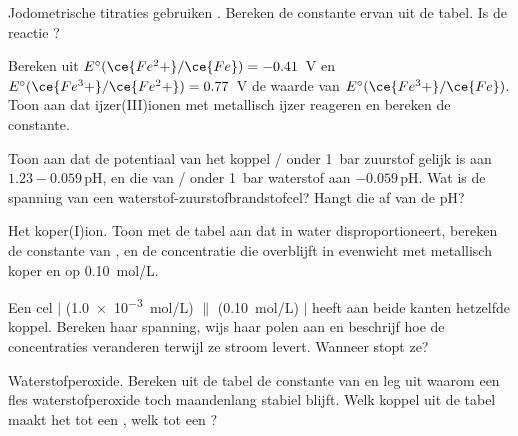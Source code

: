 \begin{exercise}[$\star\star$]\label{exo:b1:nernst:7}
Jodometrische titraties gebruiken .
Bereken de constante ervan uit de tabel. Is de reactie ?
\end{exercise}

\begin{exercise}[$\star\star$]\label{exo:b1:nernst:8}
Bereken uit $E^\circ(\ce{Fe^2+}/\ce{Fe}) = -0.41$~V en $E^\circ(\ce{Fe^3+}/\ce{Fe^2+})
= 0.77$~V de waarde van $E^\circ(\ce{Fe^3+}/\ce{Fe})$. Toon aan dat
ijzer(III)ionen met metallisch ijzer reageren en bereken de constante.
\end{exercise}

\begin{exercise}[$\star\star$]\label{exo:b1:nernst:9}
Toon aan dat de potentiaal van het koppel / onder
\qty{1}{bar} zuurstof gelijk is aan $1.23 - 0.059\,\mathrm{pH}$, en die van
/ onder \qty{1}{bar} waterstof aan $-0.059\,\mathrm{pH}$.
Wat is de spanning van een waterstof-zuurstofbrandstofcel? Hangt die af
van de pH?
\end{exercise}

\begin{exercise}[$\star\star\star$]\label{exo:b1:nernst:10}
Het koper(I)ion. Toon met de tabel aan dat  in water
disproportioneert, bereken de constante van , en
de concentratie  die overblijft in evenwicht met metallisch
koper en  op \qty{0.10}{mol/L}.
\end{exercise}

\begin{exercise}[$\star\star\star$]\label{exo:b1:nernst:11}
Een cel  $|$  (\qty{1.0e-3}{mol/L}) $\|$ 
(\qty{0.10}{mol/L}) $|$  heeft aan beide kanten hetzelfde koppel.
Bereken haar spanning, wijs haar polen aan en beschrijf hoe de
concentraties veranderen terwijl ze stroom levert. Wanneer stopt ze?
\end{exercise}

\begin{exercise}[$\star\star\star$]\label{exo:b1:nernst:12}
Waterstofperoxide. Bereken uit de tabel de constante van
 en leg uit waarom een fles waterstofperoxide toch
maandenlang stabiel blijft. Welk koppel uit de tabel maakt het tot een
, welk tot een ?
\end{exercise}

